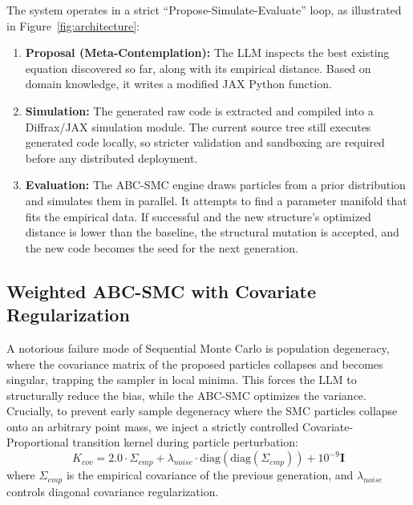 The system operates in a strict ``Propose-Simulate-Evaluate'' loop, as illustrated in Figure~\ref{fig:architecture}:
\begin{enumerate}
    \item \textbf{Proposal (Meta-Contemplation):} The LLM inspects the best existing equation discovered so far, along with its empirical distance. Based on domain knowledge, it writes a modified JAX Python function.
    \item \textbf{Simulation:} The generated raw code is extracted and compiled into a Diffrax/JAX simulation module. The current source tree still executes generated code locally, so stricter validation and sandboxing are required before any distributed deployment.
    \item \textbf{Evaluation:} The ABC-SMC engine draws particles from a prior distribution and simulates them in parallel. It attempts to find a parameter manifold that fits the empirical data. If successful and the new structure's optimized distance is lower than the baseline, the structural mutation is accepted, and the new code becomes the seed for the next generation.
\end{enumerate}

\subsection{Weighted ABC-SMC with Covariate Regularization}
A notorious failure mode of Sequential Monte Carlo is population degeneracy, where the covariance matrix of the proposed particles collapses and becomes singular, trapping the sampler in local minima. This forces the LLM to structurally reduce the bias, while the ABC-SMC optimizes the variance. Crucially, to prevent early sample degeneracy where the SMC particles collapse onto an arbitrary point mass, we inject a strictly controlled Covariate-Proportional transition kernel during particle perturbation:
\begin{equation}
    K_{cov} = 2.0 \cdot \Sigma_{emp} + \lambda_{noise} \cdot \text{diag}(\text{diag}(\Sigma_{emp})) + 10^{-9} \mathbf{I}
\end{equation}
where $\Sigma_{emp}$ is the empirical covariance of the previous generation, and $\lambda_{noise}$ controls diagonal covariance regularization.

